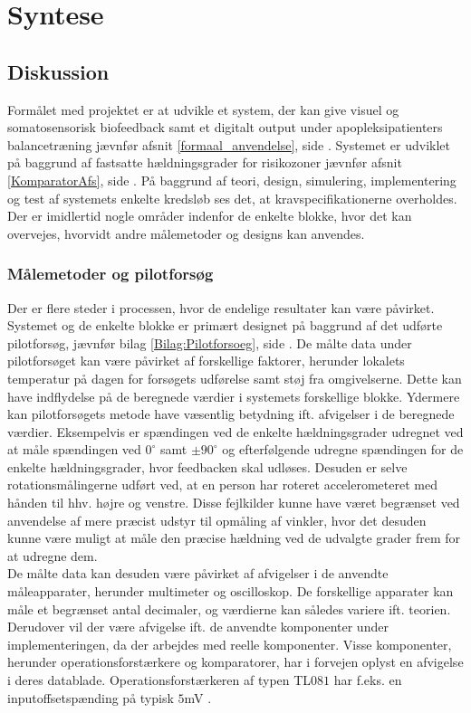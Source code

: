 \chapter{Syntese}
\section{Diskussion}
Formålet med projektet er at udvikle et system, der kan give visuel og somatosensorisk biofeedback samt et digitalt output under apopleksipatienters balancetræning jævnfør afsnit \ref{formaal_anvendelse}, side \pageref{formaal_anvendelse}. Systemet er udviklet på baggrund af fastsatte hældningsgrader for risikozoner jævnfør afsnit \ref{KomparatorAfs}, side \pageref{KomparatorAfs}. På baggrund af teori, design, simulering, implementering og test af systemets enkelte kredsløb ses det, at kravspecifikationerne overholdes. Der er imidlertid nogle områder indenfor de enkelte blokke, hvor det kan overvejes, hvorvidt andre målemetoder og designs kan anvendes.

\subsection{Målemetoder og pilotforsøg}
Der er flere steder i processen, hvor de endelige resultater kan være  påvirket. Systemet og de enkelte blokke er primært designet på baggrund af det udførte pilotforsøg, jævnfør bilag \ref{Bilag:Pilotforsoeg}, side \pageref{Bilag:Pilotforsoeg}. De målte data under pilotforsøget kan være påvirket af forskellige faktorer, herunder lokalets temperatur på dagen for forsøgets udførelse samt støj fra omgivelserne. Dette kan have indflydelse på de beregnede værdier i systemets forskellige blokke.
Ydermere kan pilotforsøgets metode have væsentlig betydning ift. afvigelser i de beregnede værdier. Eksempelvis er spændingen ved de enkelte hældningsgrader udregnet ved at måle spændingen ved $0^{\circ}$ samt $\pm90^{\circ}$ og efterfølgende udregne spændingen for de enkelte hældningsgrader, hvor feedbacken skal udløses. Desuden er selve rotationsmålingerne udført ved, at en person har roteret accelerometeret med hånden til hhv. højre og venstre. Disse fejlkilder kunne have været begrænset ved anvendelse af mere præcist udstyr til opmåling af vinkler, hvor det desuden kunne være muligt at måle den præcise hældning ved de udvalgte grader frem for at udregne dem.  \\
De målte data kan desuden være påvirket af afvigelser i de anvendte måleapparater, herunder multimeter og oscilloskop. De forskellige apparater kan måle et begrænset antal decimaler, og værdierne kan således variere ift. teorien. Derudover vil der være afvigelse ift. de anvendte komponenter under implementeringen, da der arbejdes med reelle komponenter. Visse komponenter, herunder operationsforstærkere og komparatorer, har i forvejen oplyst en afvigelse i deres datablade. Operationsforstærkeren af typen TL$081$ har f.eks. en inputoffsetspænding på typisk $5$mV \cite{Corporation1995}.

